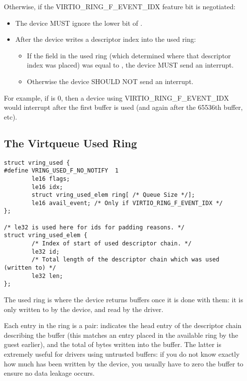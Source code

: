 Otherwise, if the VIRTIO_RING_F_EVENT_IDX feature bit is negotiated:
\begin{itemize}
\item The device MUST ignore the lower bit of .
\item After the device writes a descriptor index into the used ring:
  \begin{itemize}
  \item If the  field in the used ring (which determined
    where that descriptor index was placed) was equal to
    , the device MUST send an interrupt.
  \item Otherwise the device SHOULD NOT send an interrupt.
  \end{itemize}
\end{itemize}

\begin{note}
For example, if  is 0, then a device using
  VIRTIO_RING_F_EVENT_IDX would interrupt after the first buffer is
  used (and again after the 65536th buffer, etc).
\end{note}

\subsection{The Virtqueue Used Ring}\label{sec:Basic Facilities of a Virtio Device / Virtqueues / The Virtqueue Used Ring}

\begin{lstlisting}
struct vring_used {
#define VRING_USED_F_NO_NOTIFY  1
        le16 flags;
        le16 idx;
        struct vring_used_elem ring[ /* Queue Size */];
        le16 avail_event; /* Only if VIRTIO_RING_F_EVENT_IDX */
};

/* le32 is used here for ids for padding reasons. */
struct vring_used_elem {
        /* Index of start of used descriptor chain. */
        le32 id;
        /* Total length of the descriptor chain which was used (written to) */
        le32 len;
};
\end{lstlisting}

The used ring is where the device returns buffers once it is done with
them: it is only written to by the device, and read by the driver.

Each entry in the ring is a pair:  indicates the head entry of the
descriptor chain describing the buffer (this matches an entry
placed in the available ring by the guest earlier), and  the total
of bytes written into the buffer. The latter is extremely useful
for drivers using untrusted buffers: if you do not know exactly
how much has been written by the device, you usually have to zero
the buffer to ensure no data leakage occurs.

